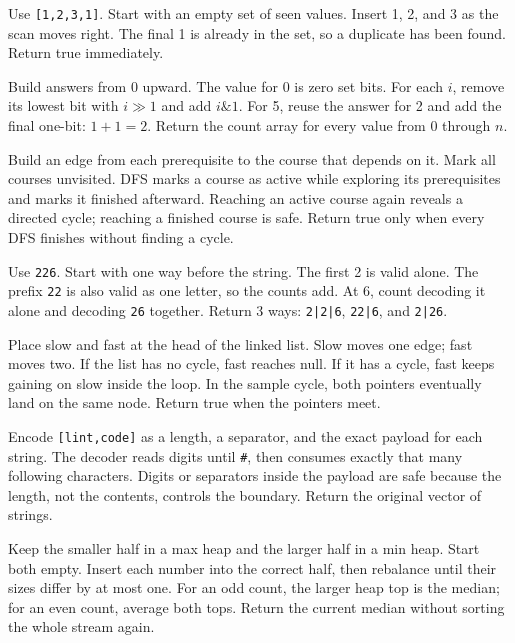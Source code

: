 \expandafter\def\csname lessontrace@14\endcsname{\visualtrace
  {Use \texttt{[1,2,3,1]}. Start with an empty set of seen values.}
  {Insert 1, 2, and 3 as the scan moves right.}
  {The final 1 is already in the set, so a duplicate has been found.}
  {Return true immediately.}}

\expandafter\def\csname lessontrace@15\endcsname{\visualtrace
  {Build answers from 0 upward. The value for 0 is zero set bits.}
  {For each \(i\), remove its lowest bit with \(i\gg1\) and add \(i\mathbin{\&}1\).}
  {For 5, reuse the answer for 2 and add the final one-bit: \(1+1=2\).}
  {Return the count array for every value from 0 through \(n\).}}

\expandafter\def\csname lessontrace@16\endcsname{\visualtrace
  {Build an edge from each prerequisite to the course that depends on it. Mark all courses unvisited.}
  {DFS marks a course as active while exploring its prerequisites and marks it finished afterward.}
  {Reaching an active course again reveals a directed cycle; reaching a finished course is safe.}
  {Return true only when every DFS finishes without finding a cycle.}}

\expandafter\def\csname lessontrace@17\endcsname{\visualtrace
  {Use \texttt{226}. Start with one way before the string.}
  {The first 2 is valid alone. The prefix \texttt{22} is also valid as one letter, so the counts add.}
  {At 6, count decoding it alone and decoding \texttt{26} together.}
  {Return 3 ways: \texttt{2|2|6}, \texttt{22|6}, and \texttt{2|26}.}}

\expandafter\def\csname lessontrace@18\endcsname{\visualtrace
  {Place slow and fast at the head of the linked list. Slow moves one edge; fast moves two.}
  {If the list has no cycle, fast reaches null. If it has a cycle, fast keeps gaining on slow inside the loop.}
  {In the sample cycle, both pointers eventually land on the same node.}
  {Return true when the pointers meet.}}

\expandafter\def\csname lessontrace@19\endcsname{\visualtrace
  {Encode \texttt{[lint,code]} as a length, a separator, and the exact payload for each string.}
  {The decoder reads digits until \texttt{\#}, then consumes exactly that many following characters.}
  {Digits or separators inside the payload are safe because the length, not the contents, controls the boundary.}
  {Return the original vector of strings.}}

\expandafter\def\csname lessontrace@20\endcsname{\visualtrace
  {Keep the smaller half in a max heap and the larger half in a min heap. Start both empty.}
  {Insert each number into the correct half, then rebalance until their sizes differ by at most one.}
  {For an odd count, the larger heap top is the median; for an even count, average both tops.}
  {Return the current median without sorting the whole stream again.}}

